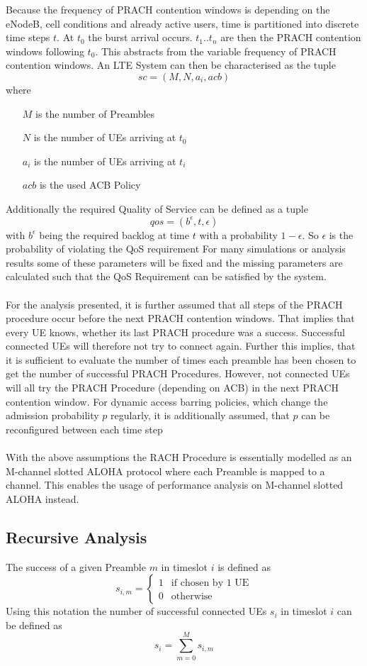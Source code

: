 \documentclass[conference]{IEEEtran}
\begin{document}
Because the frequency of PRACH contention windows is depending on the eNodeB, cell conditions and already active users, time is partitioned into discrete time steps $t$.
At $t_0$ the burst arrival occurs.
$t_1 .. t_n$ are then the PRACH contention windows following $t_0$. This abstracts from the variable frequency of PRACH contention windows.
An LTE System can then be characterised as the tuple \[sc = (M, N, a_i, acb)\]
where \begin{itemize}
          \item[$M$] is the number of Preambles
          \item[$N$] is the number of UEs arriving at $t_0$
          \item[$a_i$] is the number of UEs arriving at $t_i$
          \item[$acb$] is the used ACB Policy
\end{itemize}

Additionally the required Quality of Service can be defined as a tuple \[qos = (b^\epsilon, t, \epsilon)\]
with $b^\epsilon$ being the required backlog at time $t$ with a probability $1-\epsilon$.
So $\epsilon$ is the probability of violating the QoS requirement
For many simulations or analysis results some of these parameters will be fixed and the missing parameters are calculated such that the QoS Requirement can be satisfied by the system.\\\\
For the analysis presented, it is further assumed that all steps of the PRACH procedure occur before the next PRACH contention windows.
That implies that every UE knows, whether its last PRACH procedure was a success.
Successful connected UEs will therefore not try to connect again.
Further this implies, that it is sufficient to evaluate the number of times each preamble has been chosen to get the number of successful PRACH Procedures.
However, not connected UEs will all try the PRACH Procedure (depending on ACB) in the next PRACH contention window.
For dynamic access barring policies, which change the admission probability $p$ regularly,  it is additionally assumed, that $p$ can be reconfigured between each time step\\\\
With the above assumptions the RACH Procedure is essentially modelled as an M-channel slotted ALOHA protocol where each Preamble is mapped to a channel.
This enables the usage of performance analysis on M-channel slotted ALOHA instead.
\subsection{Recursive Analysis}\label{deterministic}
The success of a given Preamble $m$ in timeslot $i$ is defined as
        \[s_{i,m}= \begin{cases}
                       1& \text{if chosen by 1 UE}\\
                       0 &\text{otherwise}
        \end{cases}\]
Using this notation the number of successful connected UEs $s_i$ in timeslot $i$ can be defined as
\[s_i = \sum_{m = 0}^M s_{i,m}\]
\end{document}
